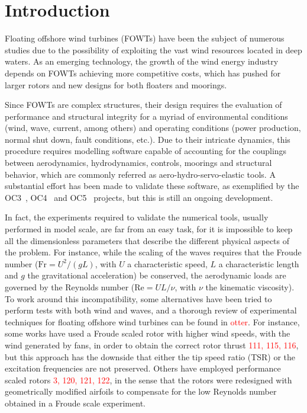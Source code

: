 \section{Introduction} \label{sec:introduction}
Floating offshore wind turbines (FOWTs) have been the subject of numerous studies due to the possibility of exploiting the vast wind resources located in deep waters. As an emerging technology, the growth of the wind energy industry depends on FOWTs achieving more competitive costs, which has pushed for larger rotors and new designs for both floaters and moorings.

Since FOWTs are complex structures, their design requires the evaluation of performance and structural integrity for a myriad of environmental conditions (wind, wave, current, among others) and operating conditions (power production, normal shut down, fault conditions, etc.). Due to their intricate dynamics, this procedure requires modelling software capable of accounting for the couplings between aerodynamics, hydrodynamics, controls, moorings and structural behavior, which are commonly referred as aero-hydro-servo-elastic tools. A substantial effort has been made to validate these software, as exemplified by the OC3~\citep{jonkman2010report}, OC4~\citep{OC42014} and OC5~\citep{OC52017} projects, but this is still an ongoing development.

In fact, the experiments required to validate the numerical tools, usually performed in model scale, are far from an easy task, for it is impossible to keep all the dimensionless parameters that describe the different physical aspects of the problem. For instance, while the scaling of the waves requires that the Froude number ($\textrm{Fr} = U^2/(gL)$, with $U$ a characteristic speed, $L$ a characteristic length and $g$ the gravitational acceleration) be conserved, the aerodynamic loads are governed by the Reynolds number ($\textrm{Re} = UL/\nu$, with $\nu$ the kinematic viscosity). To work around this incompatibility, some alternatives have been tried to perform tests with both wind and waves, and a thorough review of experimental techniques for floating offshore wind turbines can be found in \textcolor{red}{otter}. For instance, some works have used a Froude scaled rotor with higher wind speeds, with the wind generated by fans, in order to obtain the correct rotor thrust \textcolor{red}{111, 115, 116}, but this approach has the downside that either the tip speed ratio (TSR) or the excitation frequencies are not preserved. Others have employed performance scaled rotors \textcolor{red}{3, 120, 121, 122}, in the sense that the rotors were redesigned with geometrically modified airfoils to compensate for the low Reynolds number obtained in a Froude scale experiment. 

